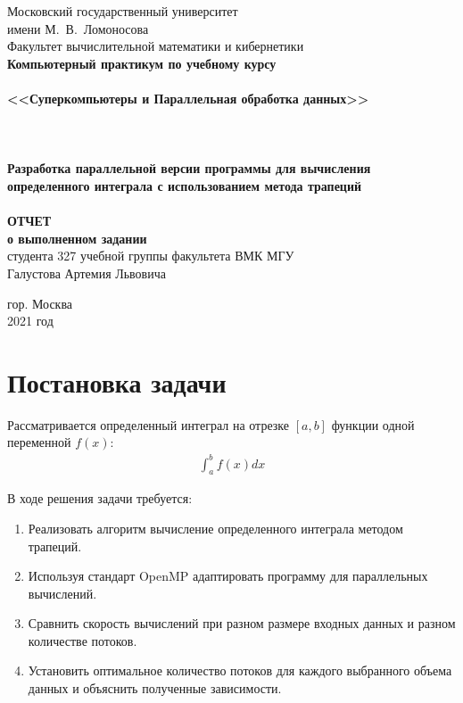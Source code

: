 \documentclass[a4paper,12pt,titlepage,finall]{article}
\begin{document}
\begin{titlepage}
    \begin{center}
	{\small \sc Московский государственный университет \\имени М.~В.~Ломоносова\\
	Факультет вычислительной математики и кибернетики\\}
	\hrulefill
	\vfill
	{\large \bf Компьютерный практикум по учебному курсу}\\
	~\\
	{\Large \bf <<Суперкомпьютеры и Параллельная
обработка данных>>}\\ 
	~\\
	~\\
	~\\
	{\bf Разработка параллельной версии программы для вычисления определенного интеграла с использованием метода трапеций}\\
	~\\
	{\large \bf ОТЧЕТ}\\
	{\bf о выполненном задании}\\
	{студента 327 учебной группы факультета ВМК МГУ}\\
	{Галустова Артемия Львовича}
    \end{center}
    
    \begin{center}
	\vfill
	{\small гор. Москва\\2021 год}
    \end{center}
\end{titlepage}

\tableofcontents
\newpage
\section{Постановка задачи}
Рассматривается определенный интеграл на отрезке $[a,b]$ функции одной переменной $f(x)$:
\begin{align*}
\int^b_a f(x) dx
\end{align*}

В ходе решения задачи требуется:
\begin{enumerate}
\item Реализовать алгоритм вычисление определенного интеграла методом трапеций.
\item Используя стандарт OpenMP адаптировать программу для параллельных вычислений.
\item Сравнить скорость вычислений при разном размере входных данных и разном количестве потоков.
\item Установить оптимальное количество потоков для каждого выбранного объема данных и объяснить полученные зависимости.
\end{enumerate}
\newpage
\end{document}
